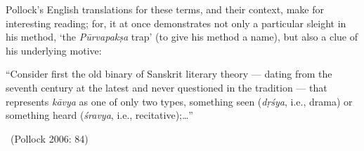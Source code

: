 Pollock’s English translations for these terms, and their context, make for interesting reading; for, it at once demonstrates not only a particular sleight in his method, ‘the \textit{Pūrvapakṣa} trap’ (to give his method a name), but also a clue of his underlying motive:

\begin{myquote}
“Consider first the old binary of Sanskrit literary theory — dating from the seventh century at the latest and never questioned in the tradition — that represents \textit{kāvya} as one of only two types, something seen (\textit{dṛśya}, i.e., drama) or something heard (\textit{śravya}, i.e., recitative);…” 

~\hfill (Pollock 2006: 84)
\end{myquote}

